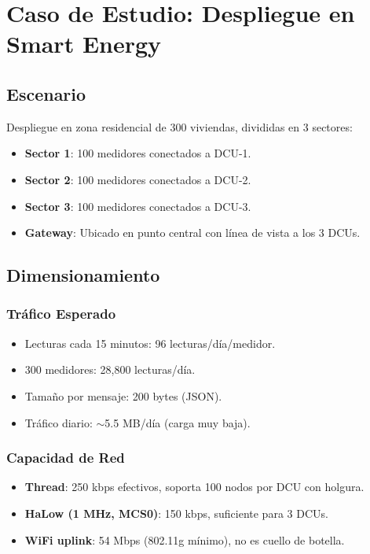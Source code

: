 \section{Caso de Estudio: Despliegue en Smart Energy}

\subsection{Escenario}

Despliegue en zona residencial de 300 viviendas, divididas en 3 sectores:

\begin{itemize}
    \item \textbf{Sector 1}: 100 medidores conectados a DCU-1.
    \item \textbf{Sector 2}: 100 medidores conectados a DCU-2.
    \item \textbf{Sector 3}: 100 medidores conectados a DCU-3.
    \item \textbf{Gateway}: Ubicado en punto central con línea de vista a los 3 DCUs.
\end{itemize}

\subsection{Dimensionamiento}

\subsubsection{Tráfico Esperado}

\begin{itemize}
    \item Lecturas cada 15 minutos: 96 lecturas/día/medidor.
    \item 300 medidores: 28,800 lecturas/día.
    \item Tamaño por mensaje: 200 bytes (JSON).
    \item Tráfico diario: $\sim$5.5 MB/día (carga muy baja).
\end{itemize}

\subsubsection{Capacidad de Red}

\begin{itemize}
    \item \textbf{Thread}: 250 kbps efectivos, soporta 100 nodos por DCU con holgura.
    \item \textbf{HaLow (1 MHz, MCS0)}: 150 kbps, suficiente para 3 DCUs.
    \item \textbf{WiFi uplink}: 54 Mbps (802.11g mínimo), no es cuello de botella.
\end{itemize}

